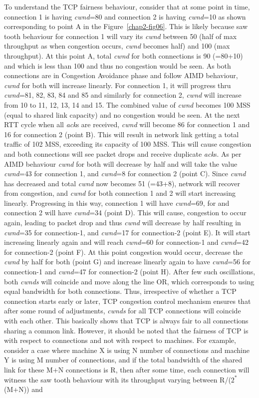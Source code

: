 \begin{multicols}{2}
To understand the TCP fairness behaviour, consider that at some point in time, connection 1 is having \textit{cwnd}=80 and connection 2 is having \textit{cwnd}=10 as shown corresponding to point A in the Figure~\ref{chap2-fig06}. This is likely because saw tooth behaviour for connection 1 will vary its \textit{cwnd} between 50 (half of max throughput as when congestion occurs, \textit{cwnd} becomes half) and 100 (max throughput). At this point A, total \textit{cwnd} for both connections is 90 (=80+10) and which is less than 100 and thus no congestion would be seen. As both connections are in Congestion Avoidance phase and follow AIMD behaviour, \textit{cwnd} for both will increase linearly. For connection 1, it will progress thru \textit{cwnd}=81, 82, 83, 84 and 85 and similarly for connection 2, \textit{cwnd} will increase from 10 to 11, 12, 13, 14 and 15. The combined value of \textit{cwnd} becomes 100 MSS (equal to shared link capacity) and no congestion would be seen. At the next RTT cycle when all \textit{ack}s are received, \textit{cwnd} will become 86 for connection 1 and 16 for connection 2 (point B). This will result in network link getting a total traffic of 102 MSS, exceeding its capacity of 100 MSS. This will cause congestion and both connections will see packet drops and receive duplicate \textit{ack}s. As per AIMD behaviour \textit{cwnd} for both will decrease by half and will take the value \textit{cwnd}=43 for connection 1, and \textit{cwnd}=8 for connection 2 (point C). Since \textit{cwnd} has decreased and total \textit{cwnd} now becomes 51 (=43+8), network will recover from congestion, and \textit{cwnd} for both connection 1 and 2 will start increasing linearly. Progressing in this way, connection 1 will have \textit{cwnd}=69, for and connection 2 will have \textit{cwnd}=34 (point D). This will cause, congestion to occur again, leading to packet drop and thus \textit{cwnd} will decrease by half resulting in \textit{cwnd}=35 for connection-1, and \textit{cwnd}=17 for connection-2 (point E). It will start increasing linearly again and will reach \textit{cwnd}=60 for connection-1 and \textit{cwnd}=42 for connection-2 (point F). At this point congestion would occur, decrease the \textit{cwnd} by half for both (point G) and increase linearly again to have \textit{cwnd}=56 for connection-1 and \textit{cwnd}=47 for connection-2 (point H). After few such oscillations, both \textit{cwnds} will coincide and move along the line OR, which corresponds to using equal bandwidth for both connections. Thus, irrespective of whether a TCP connection starts early or later, TCP congestion control mechanism ensures that after some round of adjustments, \textit{cwnds} for all TCP connections will coincide with each other. This basically shows that TCP is always fair to all connections sharing a common link. However, it should be noted that the fairness of TCP is with respect to connections and not with respect to machines. For example, consider a case where machine X is using N number of connections and machine Y is using M number of connections, and if the total bandwidth of the shared link for these M+N connections is R, then after some time, each connection will witness the saw tooth behaviour with its throughput varying between R/($2^{\ast}$(M+N)) and 
\end{multicols}
